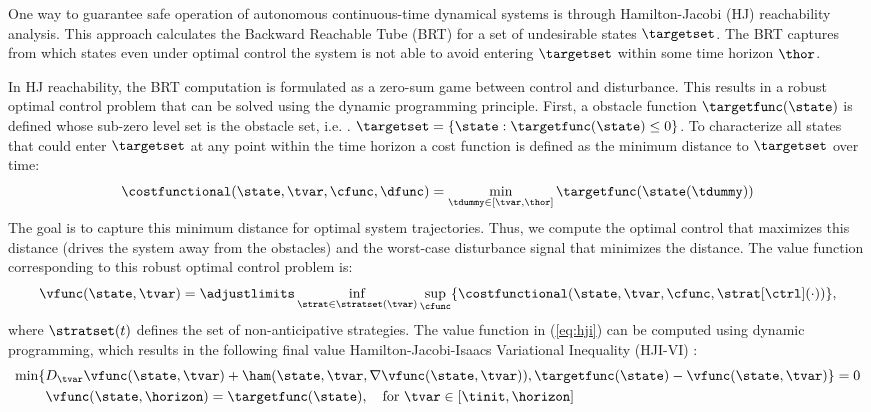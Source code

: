 One way to guarantee safe operation of autonomous continuous-time dynamical systems is through Hamilton-Jacobi (HJ) reachability analysis. This approach calculates the Backward Reachable Tube (BRT) for a set of undesirable states $\targetset$. The BRT captures from which states even under optimal control the system is not able to avoid entering $\targetset$ within some time horizon $\thor$.

In HJ reachability, the BRT computation is formulated as a zero-sum game between control and disturbance.
This results in a robust optimal control problem that can be solved using the dynamic programming principle. 
First, a obstacle function $\targetfunc(\state)$ is defined whose sub-zero level set is the obstacle set, i.e. . $\targetset= \{\state : \targetfunc(\state)\leq 0\}$. To characterize all states that could enter $\targetset$ at any point within the time horizon a cost function is defined as the minimum distance to $\targetset$ over time:
% 
\begin{equation}
\costfunctional(\state, \tvar, \cfunc, \dfunc)=\min _{\tdummy \in[\tvar, \thor]} \targetfunc (\state(\tdummy))
\end{equation}
% 
The goal is to capture this minimum distance for optimal system trajectories. Thus, we compute the optimal control that maximizes this distance (drives the system away from the obstacles) and the worst-case disturbance signal that minimizes the distance. The value function corresponding to this robust optimal control problem is:
% 
\begin{equation}\label{eq:hji}
 \vfunc(\state, \tvar)=\adjustlimits\inf_{\strat \in \stratset(\tvar)} \sup_{\cfunc} \{\costfunctional(\state, \tvar, \cfunc, \strat[\ctrl](\cdot))\},
\end{equation}
% 
where $\stratset(t)$ defines the set of non-anticipative strategies.
The value function in (\ref{eq:hji}) can be computed using dynamic programming, which results in the following final value Hamilton-Jacobi-Isaacs Variational Inequality (HJI-VI) \cite{bansal2017hamilton,lygeros2004reachability,mitchell2005time}:
% 
\begin{equation} \label{eq:pde}
    \begin{aligned}
    \min \{&D_{\tvar} \vfunc(\state, \tvar) + \ham(\state, \tvar, \nabla \vfunc(\state, \tvar)), \targetfunc(\state) - \vfunc(\state, \tvar) \} = 0 \\
    &\vfunc(\state, \horizon) = \targetfunc(\state), \quad \text{for} \ \tvar \in \left[\tinit, \horizon\right]
    \end{aligned}
\end{equation}

